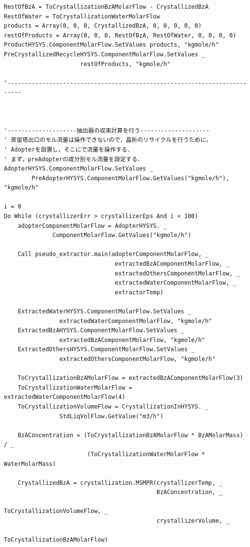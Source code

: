 \documentclass[a4j]{jsreport}
\begin{document}
\begin{lstlisting}[caption=HYSYSとpythonを繋ぐコード]
RestOfBzA = ToCrystallizationBzAMolarFlow - CrystallizedBzA
RestOfWater = ToCrystallizationWaterMolarFlow
products = Array(0, 0, 0, CrystallizedBzA, 0, 0, 0, 0, 0)
restOfProducts = Array(0, 0, 0, RestOfBzA, RestOfWater, 0, 0, 0, 0)
ProductHYSYS.ComponentMolarFlow.SetValues products, "kgmole/h"
PreCrystallizedRecycleHYSYS.ComponentMolarFlow.SetValues _
                      restOfProducts, "kgmole/h"

'--------------------------------------------------------------------------



'--------------------抽出器の収束計算を行う--------------------
' 蒸留塔出口のモル流量は操作できないので，晶析のリサイクルを行うために，
' Adopterを設置し，そこにで流量を操作する．
' まず，preAdopterの成分別モル流量を設定する．
AdopterHYSYS.ComponentMolarFlow.SetValues _
        PreAdopterHYSYS.ComponentMolarFlow.GetValues("kgmole/h"), "kgmole/h"

i = 0
Do While (crystallizerErr > crystallizerEps And i < 100)
    adopterComponentMolarFlow = AdopterHYSYS. _
              ComponentMolarFlow.GetValues("kgmole/h")

    Call pseudo_extractor.main(adopterComponentMolarFlow, _
                                extractedBzAComponentMolarFlow, _
                                extractedOthersComponentMolarFlow, _
                                extractedWaterComponentMolarFlow, _
                                extractorTemp)

    ExtractedWaterHYSYS.ComponentMolarFlow.SetValues _
                extractedWaterComponentMolarFlow, "kgmole/h"
    ExtractedBzAHYSYS.ComponentMolarFlow.SetValues _
                extractedBzAComponentMolarFlow, "kgmole/h"
    ExtractedOthersHYSYS.ComponentMolarFlow.SetValues _
                extractedOthersComponentMolarFlow, "kgmole/h"

    ToCrystallizationBzAMolarFlow = extractedBzAComponentMolarFlow(3)
    ToCrystallizationWaterMolarFlow = extractedWaterComponentMolarFlow(4)
    ToCrystallizationVolumeFlow = CrystallizationInHYSYS. _
                StdLiqVolFlow.GetValue("m3/h")

    BzAConcentration = (ToCrystallizationBzAMolarFlow * BzAMolarMass) / _
                        (ToCrystallizationWaterMolarFlow * WaterMolarMass)

    CrystallizedBzA = crystallization.MSMPR(crystallizerTemp, _
                                            BzAConcentration, _
                                            ToCrystallizationVolumeFlow, _
                                            crystallizerVolume, _
                                            ToCrystallizationBzAMolarFlow)


\end{lstlisting}
\end{document}
